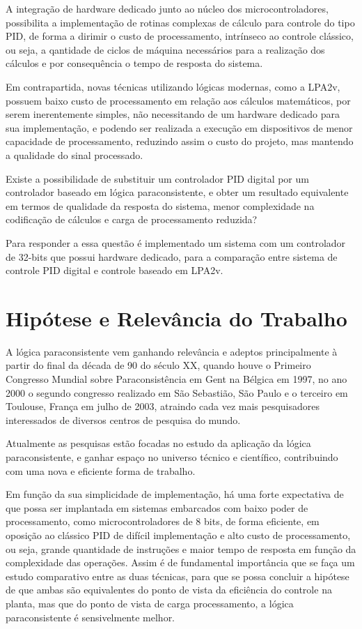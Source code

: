 A integração de hardware dedicado junto ao núcleo dos microcontroladores, possibilita a implementação de rotinas complexas de cálculo para controle do tipo PID, de forma a dirimir o custo de processamento, intrínseco ao controle clássico, ou seja, a qantidade de ciclos de máquina necessários para a realização dos cálculos e por consequência o tempo de resposta do sistema. 

Em contrapartida, novas técnicas utilizando lógicas modernas, como a LPA2v, possuem baixo custo de processamento em relação aos cálculos matemáticos, por serem inerentemente simples, não necessitando de um hardware dedicado para sua implementação, e podendo ser realizada a execução em dispositivos de menor capacidade de processamento, reduzindo assim o custo do projeto, mas mantendo a qualidade do sinal processado.

Existe a possibilidade de substituir um controlador PID digital por um controlador baseado em lógica paraconsistente, e obter um resultado equivalente em termos de qualidade da resposta do sistema, menor complexidade na codificação de cálculos e carga de processamento reduzida? 

Para responder a essa questão é implementado um sistema com um controlador de 32-bits que possui hardware dedicado, para a comparação entre sistema de controle PID digital e controle baseado em LPA2v.



\section{Hipótese e Relevância do Trabalho}

A lógica paraconsistente vem ganhando relevância e adeptos principalmente à partir do final da década de 90 do século XX, quando houve o Primeiro Congresso Mundial sobre Paraconsistência em Gent na Bélgica em 1997, no ano 2000 o segundo congresso realizado em São Sebastião, São Paulo e o terceiro em Toulouse, França em julho de 2003, atraindo cada vez mais pesquisadores interessados de diversos centros de pesquisa do mundo.  \cite{DecioKrause}

Atualmente as pesquisas estão focadas no estudo da aplicação da lógica paraconsistente, e ganhar espaço no universo técnico e científico, contribuindo com uma nova e eficiente forma de trabalho.

Em função da sua simplicidade de implementação, há uma forte expectativa de que possa ser implantada em sistemas embarcados com baixo poder de processamento, como microcontroladores de 8 bits, de forma eficiente, em oposição ao clássico PID de difícil implementação e alto custo de processamento, ou seja, grande quantidade de instruções e maior tempo de resposta em função da complexidade das operações. Assim é de fundamental importância que se faça um estudo comparativo entre as duas técnicas, para que se possa concluir a hipótese de que ambas são equivalentes do ponto de vista da eficiência do controle na planta, mas que do ponto de vista de carga processamento, a lógica paraconsistente é sensivelmente melhor.




